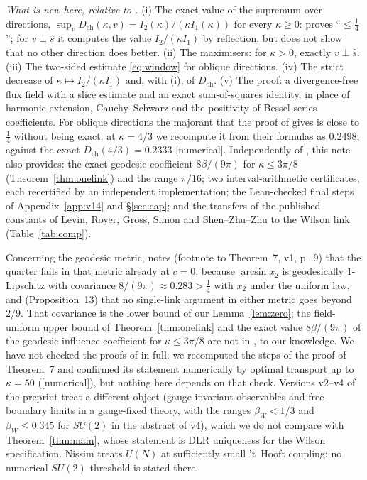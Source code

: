 \documentclass[11pt,a4paper]{article}
\theoremstyle{remark}
\theoremstyle{definition}
\theoremstyle{plain}
\theoremstyle{remark}
\newcommand{\st}[1]{\textsf{[#1]}}
\newcommand{\Dch}{D_{\mathrm{ch}}}
\begin{document}
\emph{What is new here, relative to \cite{BB26}.} (i) The exact value of the supremum over directions, $\sup_v\Dch(\kappa,v)=I_2(\kappa)/(\kappa I_1(\kappa))$ for every $\kappa\ge0$:
\cite{BB26} proves ``$\le\frac14$''; for $v\perp\hat s$ it computes the value $I_2/(\kappa I_1)$ by reflection, but does not show that no other direction does better.
(ii) The maximisers: for $\kappa>0$, exactly $v\perp\hat s$. (iii) The two-sided estimate \eqref{eq:window} for oblique directions.
(iv) The strict decrease of $\kappa\mapsto I_2/(\kappa I_1)$ and, with (i), of $\Dch$.
(v) The proof: a divergence-free flux field with a slice estimate and an exact sum-of-squares identity, in place of harmonic extension, Cauchy--Schwarz and the positivity of Bessel-series coefficients.
For oblique directions the majorant that the proof of \cite{BB26} gives is close to $\frac14$ without being exact: at $\kappa=4/3$ we recompute it from their formulas as $0.2498$, against the exact $\Dch(4/3)=0.2333$ \st{numerical}.
Independently of \cite{BB26}, this note also provides: the exact geodesic coefficient $8\beta/(9\pi)$ for $\kappa\le3\pi/8$ (Theorem~\ref{thm:onelink}) and the range $\pi/16$; two interval-arithmetic
certificates, each recertified by an independent implementation; the Lean-checked final steps of Appendix~\ref{app:v14} and \S\ref{sec:cap}; and the transfers of the published constants
of Levin, Royer, Gross, Simon and Shen--Zhu--Zhu to the Wilson link (Table~\ref{tab:comp}).

Concerning the geodesic metric, \cite{BB26} notes (footnote to Theorem~7, v1, p.~9) that the quarter fails in that metric already at $c=0$, because $\arcsin x_2$ is geodesically $1$-Lipschitz with covariance
$8/(9\pi)\approx0.283>\frac14$ with $x_2$ under the uniform law, and (Proposition~13) that no single-link argument in either metric goes beyond $2/9$. That covariance is the lower bound of our Lemma~\ref{lem:zero};
the field-uniform upper bound of Theorem~\ref{thm:onelink} and the exact value $8\beta/(9\pi)$ of the geodesic influence coefficient for $\kappa\le3\pi/8$ are not in \cite{BB26}, to our knowledge.
We have not checked the proofs of \cite{BB26} in full: we recomputed the steps of the proof of Theorem~7 and confirmed its statement numerically by optimal transport up to $\kappa=50$ (\st{numerical}), but nothing here depends on that check.
Versions v2--v4 of the preprint treat a different object (gauge-invariant observables and free-boundary limits in a gauge-fixed theory, with the ranges $\beta_W<1/3$ and $\beta_W\le0.345$ for $SU(2)$ in the abstract of v4),
which we do not compare with Theorem~\ref{thm:main}, whose statement is DLR uniqueness for the Wilson specification. Nissim \cite{Nis25} treats $U(N)$ at sufficiently small 't~Hooft coupling; no numerical $SU(2)$ threshold is stated there.
\end{document}
